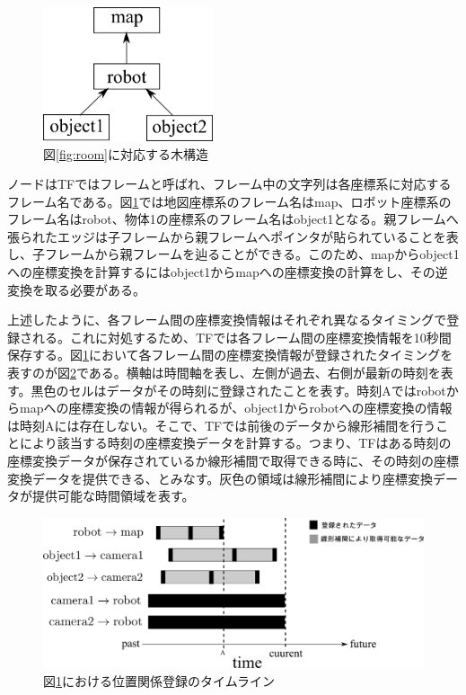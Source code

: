 \documentclass[a4paper]{jreport}	%
\begin{document}
\begin{figure}[h] 
\centering
\includegraphics[width=5cm]{tree}	
\caption{図\ref{fig:room}に対応する木構造}
\label{fig:room-tree}
\end{figure}


ノードはTFではフレームと呼ばれ、フレーム中の文字列は各座標系に対応するフレーム名である。図\ref{fig:room-tree}では地図座標系のフレーム名はmap、ロボット座標系のフレーム名はrobot、物体1の座標系のフレーム名はobject1となる。親フレームへ張られたエッジは子フレームから親フレームへポインタが貼られていることを表し、子フレームから親フレームを辿ることができる。このため、mapからobject1への座標変換を計算するにはobject1からmapへの座標変換の計算をし、その逆変換を取る必要がある。

上述したように、各フレーム間の座標変換情報はそれぞれ異なるタイミングで登録される。これに対処するため、TFでは各フレーム間の座標変換情報を10秒間保存する。図\ref{fig:room-tree}において各フレーム間の座標変換情報が登録されたタイミングを表すのが図\ref{fig:room-timeline}である。横軸は時間軸を表し、左側が過去、右側が最新の時刻を表す。黒色のセルはデータがその時刻に登録されたことを表す。時刻Aではrobotからmapへの座標変換の情報が得られるが、object1からrobotへの座標変換の情報は時刻Aには存在しない。そこで、TFでは前後のデータから線形補間を行うことにより該当する時刻の座標変換データを計算する。つまり、TFはある時刻の座標変換データが保存されているか線形補間で取得できる時に、その時刻の座標変換データを提供できる、とみなす。灰色の領域は線形補間により座標変換データが提供可能な時間領域を表す。

\begin{figure}[h] 
\centering
\includegraphics[width=15cm]{room-timeline}	
\caption{図\ref{fig:room-tree}における位置関係登録のタイムライン}
\label{fig:room-timeline}
\end{figure}
\end{document}
